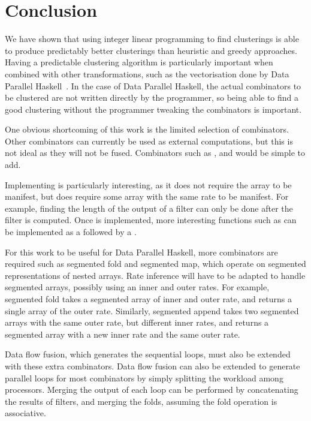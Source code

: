 

\section{Conclusion}
We have shown that using integer linear programming to find clusterings is able to produce predictably better clusterings than heuristic and greedy approaches.
Having a predictable clustering algorithm is particularly important when combined with other transformations, such as the vectorisation done by Data Parallel Haskell~\cite{chakravarty2007data}.
In the case of Data Parallel Haskell, the actual combinators to be clustered are not written directly by the programmer, so being able to find a good clustering without the programmer tweaking the combinators is important.

One obvious shortcoming of this work is the limited selection of combinators.
Other combinators can currently be used as external computations, but this is not ideal as they will not be fused.
Combinators such as \Hs@append@, \Hs@scan@ and \Hs@slice@ would be simple to add.

Implementing \Hs@length@ is particularly interesting, as it does not require the array to be manifest, but does require some array with the same rate to be manifest.
For example, finding the length of the output of a filter can only be done after the filter is computed.
Once \Hs@length@ is implemented, more interesting functions such as \Hs@reverse@ can be implemented as a \Hs@generate@ followed by a \Hs@gather@.

For this work to be useful for Data Parallel Haskell, more combinators are required such as segmented fold and segmented map, which operate on segmented representations of nested arrays.
Rate inference will have to be adapted to handle segmented arrays, possibly using an inner and outer rates.
For example, segmented fold takes a segmented array of inner and outer rate, and returns a single array of the outer rate.
Similarly, segmented append takes two segmented arrays with the same outer rate, but different inner rates, and returns a segmented array with a new inner rate and the same outer rate.

Data flow fusion, which generates the sequential loops, must also be extended with these extra combinators.
Data flow fusion can also be extended to generate parallel loops for most combinators by simply splitting the workload among processors.
Merging the output of each loop can be performed by concatenating the results of filters, and merging the folds, assuming the fold operation is associative.

